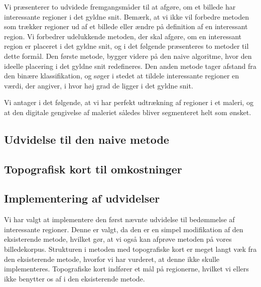 {
{\sffamily Vi præsenterer to udvidede fremgangsmåder til at afgøre, om
et billede har interessante regioner i det gyldne snit. Bemærk, at vi
ikke vil forbedre metoden som trækker regioner ud af et billede eller
ændre på definition af en interessant region. Vi forbedrer udelukkende
metoden, der skal afgøre, om en interessant region er placeret i det
gyldne snit, og i det følgende præsenteres to metoder til dette formål.
Den første metode, bygger videre på den naive algoritme, hvor den
ideelle placering i det gyldne snit redefineres. Den anden metode tager
afstand fra den binære klassifikation, og søger i stedet at tildele
interessante regioner en værdi, der angiver, i hvor høj grad de ligger i
det gyldne snit.

Vi antager i det følgende, at vi har perfekt udtrækning af regioner i et
maleri, og at den digitale gengivelse af maleriet således bliver
segmenteret helt som ønsket.
}

\subsection{Udvidelse til den naive metode\label{subsec_udvidet_massemidtpunkt}}


\subsection{Topografisk kort til omkostninger}


\subsection{Implementering af udvidelser}
Vi har valgt at implementere den først nævnte udvidelse til bedømmelse
af interessante regioner. Denne er valgt, da den er en simpel
modifikation af den eksisterende metode, hvilket gør, at vi også kan
afprøve metoden på vores billedekorpus. Strukturen i metoden med topografiske
kort er meget langt væk fra den eksisterende metode, hvorfor vi har
vurderet, at denne ikke skulle implementeres. Topografiske kort indfører
et mål på regionerne, hvilket vi ellers ikke benytter os af i den
eksisterende metode.

}


